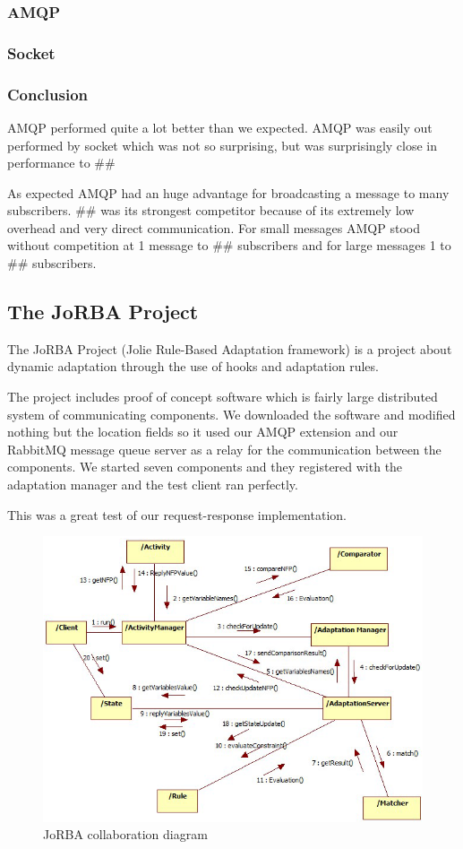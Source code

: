 \subsubsection{AMQP}





\subsubsection{Socket}

\subsubsection{Conclusion}
AMQP performed quite a lot better than we expected. AMQP was easily out performed by socket which was not so surprising, but was surprisingly close in performance to \#\#

As expected AMQP had an huge advantage for broadcasting a message to many subscribers. \#\# was its strongest competitor because of its extremely low overhead and very direct communication. For small messages AMQP stood without competition at 1 message to \#\# subscribers and for large messages 1 to \#\# subscribers.
\subsection{The JoRBA Project}
\label{subsec:The JoRBA Project}
The JoRBA Project\cite{Jorba} (Jolie Rule-Based Adaptation framework) is a project about dynamic adaptation through the use of hooks and adaptation rules.

The project includes proof of concept software which is fairly large distributed system of communicating components. We downloaded the software and modified nothing but the location fields so it used our AMQP extension and our RabbitMQ message queue server as a relay for the communication between the components. We started seven components and they registered with the adaptation manager and the test client ran perfectly.

This was a great test of our request-response implementation.
\begin{figure}[H]
  \includegraphics[width=\textwidth]{illustrations/Jorba.png}
  \caption{JoRBA collaboration diagram}
\end{figure}
\newpage
